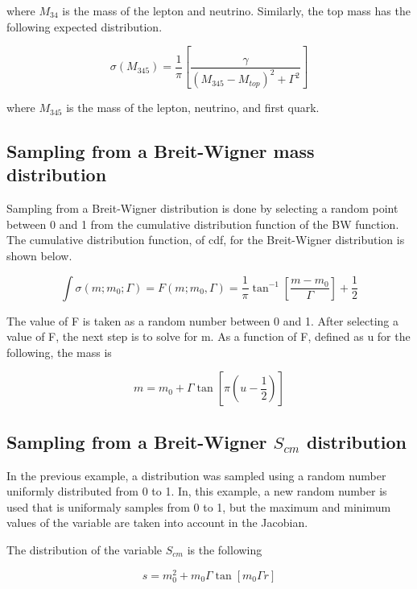where $M_{34}$ is the mass of the lepton and neutrino. Similarly, the top mass
has the following expected distribution.

\begin{equation}
\sigma(M_{345}) = \frac{1}{\pi} \left[ \frac{\gamma}{(M_{345} - M_{top})^{2} +
\Gamma^{2}} \right]
\end{equation}

where  $M_{345}$ is the mass of the lepton, neutrino, and first quark.

\subsection{Sampling from a Breit-Wigner mass distribution}

Sampling from a Breit-Wigner distribution is done by selecting a random point
between 0 and 1 from the cumulative distribution function of the BW
function. The cumulative distribution function, of cdf, for the Breit-Wigner
distribution is shown below.

\begin{equation}
\label{sample}
\int \sigma(m;m_{0};\Gamma) = F(m;m_{0},\Gamma) = \frac{1}{\pi} \tan^{-1} \left[
\frac{m-m_{0}}{\Gamma} \right] + \frac{1}{2}
\end{equation}

The value of F is taken as a random number between 0 and 1. After selecting a
value of F, the next step is to solve for m. As a function of F, defined as u for
the following, the mass is 


\begin{equation}
m = m_{0} + \Gamma \tan \left[ \pi(u - \frac{1}{2}) \right]
\end{equation}

\subsection{Sampling from a Breit-Wigner $S_{cm}$ distribution}

In the previous example, a distribution was sampled using a random number
uniformly distributed from 0 to 1. In, this example, a new random number is used
that is uniformaly samples from 0 to 1, but the maximum and minimum values of
the variable are taken into account in the Jacobian.

The distribution of the variable $S_{cm}$ is the following

\begin{equation}
\label{defines}
s = m_{0}^{2} + m_{0}\Gamma \tan \left[ m_{0} \Gamma r \right]
\end{equation}

